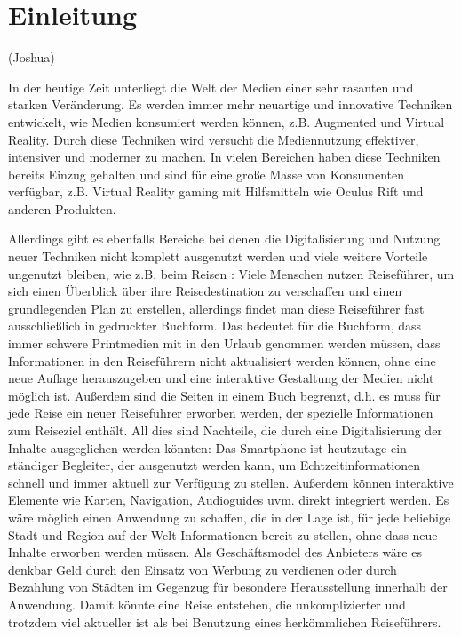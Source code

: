 \chapter{Einleitung}

	(Joshua)

	In der heutige Zeit unterliegt die Welt der Medien einer sehr rasanten und starken Veränderung. Es werden immer mehr neuartige und innovative Techniken entwickelt, wie Medien konsumiert werden können, z.B. Augmented und Virtual Reality. Durch diese Techniken wird versucht die Mediennutzung effektiver, intensiver und moderner zu machen. In vielen Bereichen haben diese Techniken bereits Einzug gehalten und sind für eine große Masse von Konsumenten verfügbar, z.B. Virtual Reality gaming mit Hilfsmitteln wie Oculus Rift \cite{OculusVR.3222020} und anderen Produkten.

	\vspace{0.25cm}

	Allerdings gibt es ebenfalls Bereiche bei denen die Digitalisierung und Nutzung neuer Techniken nicht komplett ausgenutzt werden und viele weitere Vorteile ungenutzt bleiben, wie z.B. beim Reisen \cite{Dredge.}: Viele Menschen nutzen Reiseführer, um sich einen Überblick über ihre Reisedestination zu verschaffen und einen grundlegenden Plan zu erstellen, allerdings findet man diese Reiseführer fast ausschließlich in gedruckter Buchform. Das bedeutet für die Buchform, dass immer schwere Printmedien mit in den Urlaub genommen werden müssen, dass Informationen in den Reiseführern nicht aktualisiert werden können, ohne eine neue Auflage herauszugeben und eine interaktive Gestaltung der Medien nicht möglich ist. Außerdem sind die Seiten in einem Buch begrenzt, d.h. es muss für jede Reise ein neuer Reiseführer erworben werden, der spezielle Informationen zum Reiseziel enthält. All dies sind Nachteile, die durch eine Digitalisierung der Inhalte ausgeglichen werden könnten: Das Smartphone ist heutzutage ein ständiger Begleiter, der ausgenutzt werden kann, um Echtzeitinformationen schnell und immer aktuell zur Verfügung zu stellen. Außerdem können interaktive Elemente wie Karten, Navigation, Audioguides uvm. direkt integriert werden. Es wäre möglich einen Anwendung zu schaffen, die in der Lage ist, für jede beliebige Stadt und Region auf der Welt Informationen bereit zu stellen, ohne dass neue Inhalte erworben werden müssen. Als Geschäftsmodel des Anbieters wäre es denkbar Geld durch den Einsatz von Werbung zu verdienen oder durch Bezahlung von Städten im Gegenzug für besondere Herausstellung innerhalb der Anwendung.  Damit könnte eine Reise entstehen, die unkomplizierter und trotzdem viel aktueller ist als bei Benutzung eines herkömmlichen Reiseführers.

